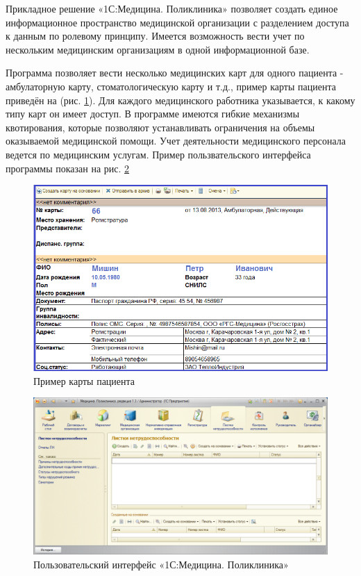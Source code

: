 \documentclass[14pt,a4paper,russian]{extreport}
\begin{document}
Прикладное решение «1С:Медицина. Поликлиника» позволяет создать единое информационное пространство
медицинской организации с разделением доступа к данным по ролевому принципу. Имеется возможность
вести учет по нескольким медицинским организациям в одной информационной базе.

Программа позволяет вести несколько медицинских карт для одного пациента - амбулаторную карту,
стоматологическую карту и т.д., пример карты пациента приведён на (рис. \ref{fig:pc}). Для каждого медицинского работника указывается, к какому типу карт
он имеет доступ. В программе имеются гибкие механизмы квотирования, которые позволяют устанавливать
ограничения на объемы оказываемой медицинской помощи. Учет деятельности медицинского персонала
ведется по медицинским услугам. Пример пользвательского интерфейса программы показан на
рис. \ref{fig:1c}
\begin{figure}[t!]
        \includegraphics[width=\textwidth]{patientcard}
        \caption{Пример карты пациента}
        \label{fig:pc}
\end{figure}
\par
\begin{figure}[h!]
        \includegraphics[width=\textwidth]{1cinterface}
        \caption{Пользовательский интерфейс «1С:Медицина. Поликлиника»}
        \label{fig:1c}
\end{figure}
\end{document}
